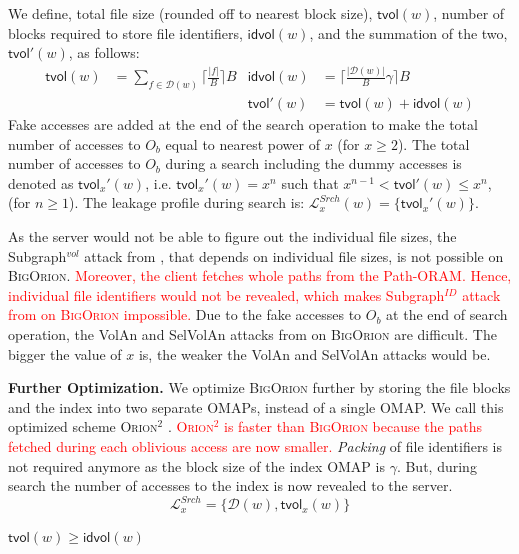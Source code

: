 \documentclass[sigconf]{acmart}
\newcommand{\DB}[1]{\mathcal{D}(#1)}
\newcommand{\vol}[1]{\lvert{#1}\rvert}
\newcommand{\ceil}[1]{\lceil #1 \rceil}
\newcommand{\BigOrion}{\textsc{BigOrion }}
\newcommand{\Bigorion}{\textsc{BigOrion}}
\newcommand{\Orionsq}{\textsc{Orion}$^{2}$ }
\newcommand{\tred}[1]{\textcolor{red}{#1}}
\newcommand{\tvol}[1]{\textsf{tvol}({#1})}
\newcommand{\tvold}[1]{\textsf{tvol}'({#1})}
\newcommand{\tvoldx}[1]{\textsf{tvol}_{x}'({#1})}
\newcommand{\idvol}[1]{\textsf{idvol}({#1})}
\newcommand{\tvolx}[1]{\textsf{tvol}_{x}({#1})}
\begin{document}
We define, total file size (rounded off to nearest block size), $\tvol{w}$, number of blocks required to store file identifiers, $\idvol{w}$, and the summation of the two, $\tvold{w}$, as follows:
\begin{align*}
   \tvol{w} &= \sum_{f \in \DB{w}} \ceil{\frac{\vol{f}}{B}}B & 
   \idvol{w} &= \ceil{\frac{\vol{\DB{w}}}{B}\gamma}B \\
 &   & \tvold{w} & =  \tvol{w} + \idvol{w}
\end{align*} 
Fake accesses are added at the end of the search operation to make the total number of accesses to $O_b$ equal to nearest power of $x$ (for $x\geq 2$). The total number of accesses to $O_b$ during a search including the dummy accesses is denoted as $\tvoldx{w}$, i.e. $\tvoldx{w}=x^n$ such that $x^{n-1} <  \tvold{w} \leq x^n$, (for $n\geq 1$). The leakage profile during search is: $\mathcal{L}_x^{Srch}(w) = \{\tvoldx{w}\}$.

As the server would not be able to figure out the individual file sizes, the \textsf{Subgraph}$^{vol}$ attack from \cite{Volat}, that depends on individual file sizes, is not possible on \Bigorion. \tred{Moreover, the client fetches whole paths from the Path-ORAM. Hence, individual file identifiers would not be revealed, which makes \textsf{Subgraph}$^{ID}$ attack from \cite{Volat} on \BigOrion impossible.} 
Due to the fake accesses to $O_b$ at the end of search operation, the \textsf{VolAn} and \textsf{SelVolAn} attacks from \cite{Volat} on \BigOrion are difficult. The bigger the value of $x$ is, the weaker the \textsf{VolAn} and \textsf{SelVolAn} attacks would be. 

\noindent\textbf{Further Optimization.}
We optimize \BigOrion further by storing the file blocks and the index into two separate OMAPs, instead of a single OMAP. We call this optimized scheme \Orionsq. \tred{\Orionsq is faster than \BigOrion because the paths fetched during each oblivious access are now smaller.} \emph{Packing} of file identifiers is not required anymore as the block size of the index OMAP is $\gamma$. But, during search the number of accesses to the index is now revealed to the server. 
$$\mathcal{L}^{Srch}_x=\{\DB{w},\tvolx{w}\}$$



\begin{lemma} \label{lemma:tvidv}
$ \tvol{w} \geq \idvol{w}$
\end{lemma}
\end{document}
